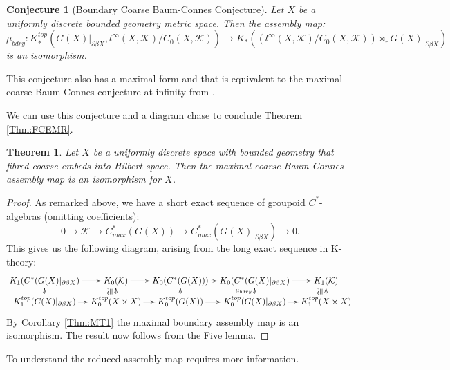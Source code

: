 \documentclass[11pt]{amsart}
\theoremstyle{plain}
\newtheorem{theorem}{Theorem}%
\newtheorem*{conjecture1}{Conjecture}
\theoremstyle{definition}%
\theoremstyle{remark}%
\newcommand{\ucong}{\rotatebox{90}{$\cong$}}
\begin{document}
{\begin{conjecture1} [Boundary Coarse Baum-Connes Conjecture]
Let $X$ be a uniformly discrete bounded geometry metric space. Then the assembly map:
\begin{equation*}
\mu_{bdry}:K_{*}^{top}(G(X)|_{\partial\beta X}, l^{\infty}(X,\mathcal{K})/C_{0}(X,\mathcal{K})) \rightarrow K_{*}((l^{\infty}(X,\mathcal{K})/C_{0}(X,\mathcal{K}))\rtimes_{r}G(X)|_{\partial\beta X})
\end{equation*}
is an isomorphism.
\end{conjecture1}

This conjecture also has a maximal form \cite[Section 2]{mypub1} and that is equivalent to the maximal coarse Baum-Connes conjecture at infinity from \cite{FCEpaper}.

We can use this conjecture and a diagram chase to conclude Theorem \ref{Thm:FCEMR}.

\begin{theorem}
Let $X$ be a uniformly discrete space with bounded geometry that fibred coarse embeds into Hilbert space. Then the maximal coarse Baum-Connes assembly map is an isomorphism for $X$.
\end{theorem}
\begin{proof}
As remarked above, we have a short exact sequence of groupoid $C^{*}$-algebras (omitting coefficients):
\begin{equation*}
0 \rightarrow \mathcal{K} \rightarrow C^{*}_{max}(G(X)) \rightarrow C^{*}_{max}(G(X)|_{\partial\beta X}) \rightarrow 0.
\end{equation*}
This gives us the following diagram, arising from the long exact sequence in K-theory:
\begin{equation*}
\xymatrix@=0.7em{
K_{1}(C^{*}(G(X)|_{\partial\beta X}) \ar[r] & K_{0}(\mathcal{K}) \ar[r]& K_{0}(C^{*}(G(X))) \ar[r]& K_{0}(C^{*}(G(X)|_{\partial\beta X})\ar[r] & K_{1}(\mathcal{K})  \\
K_{1}^{top}(G(X)|_{\partial\beta X}) \ar[r] \ar[u]& K_{0}^{top}(X \times X) \ar[r]\ar[u]^{\ucong}& K_{0}^{top}(G(X)) \ar[r]\ar[u]& K_{0}^{top}(G(X)|_{\partial\beta X}) \ar[r]\ar[u]^{\mu_{bdry}}& K_{1}^{top}(X \times X)\ar[u]^{\ucong}
}
\end{equation*}
By Corollary \ref{Thm:MT1} the maximal boundary assembly map is an isomorphism. The result now follows from the Five lemma.
\end{proof}

To understand the reduced assembly map requires more information.

}
\end{document}

